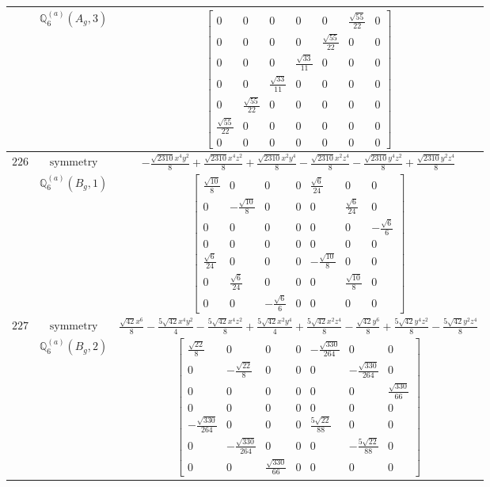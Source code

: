 \documentclass[fleqn,8pt,landscape]{jsarticle}
\begin{document}
\begin{longtable}{ccc}
$  $ & $ \mathbb{Q}_{6}^{(a)}(A_{g},3) $ & $ \begin{bmatrix} 0 & 0 & 0 & 0 & 0 & \frac{\sqrt{55}}{22} & 0 \\ 0 & 0 & 0 & 0 & \frac{\sqrt{55}}{22} & 0 & 0 \\ 0 & 0 & 0 & \frac{\sqrt{33}}{11} & 0 & 0 & 0 \\ 0 & 0 & \frac{\sqrt{33}}{11} & 0 & 0 & 0 & 0 \\ 0 & \frac{\sqrt{55}}{22} & 0 & 0 & 0 & 0 & 0 \\ \frac{\sqrt{55}}{22} & 0 & 0 & 0 & 0 & 0 & 0 \\ 0 & 0 & 0 & 0 & 0 & 0 & 0 \end{bmatrix} $ \\ \hline
$ 226 $ & $ \text{symmetry} $ & $ - \frac{\sqrt{2310} x^{4} y^{2}}{8} + \frac{\sqrt{2310} x^{4} z^{2}}{8} + \frac{\sqrt{2310} x^{2} y^{4}}{8} - \frac{\sqrt{2310} x^{2} z^{4}}{8} - \frac{\sqrt{2310} y^{4} z^{2}}{8} + \frac{\sqrt{2310} y^{2} z^{4}}{8} $ \\
$  $ & $ \mathbb{Q}_{6}^{(a)}(B_{g},1) $ & $ \begin{bmatrix} \frac{\sqrt{10}}{8} & 0 & 0 & 0 & \frac{\sqrt{6}}{24} & 0 & 0 \\ 0 & - \frac{\sqrt{10}}{8} & 0 & 0 & 0 & \frac{\sqrt{6}}{24} & 0 \\ 0 & 0 & 0 & 0 & 0 & 0 & - \frac{\sqrt{6}}{6} \\ 0 & 0 & 0 & 0 & 0 & 0 & 0 \\ \frac{\sqrt{6}}{24} & 0 & 0 & 0 & - \frac{\sqrt{10}}{8} & 0 & 0 \\ 0 & \frac{\sqrt{6}}{24} & 0 & 0 & 0 & \frac{\sqrt{10}}{8} & 0 \\ 0 & 0 & - \frac{\sqrt{6}}{6} & 0 & 0 & 0 & 0 \end{bmatrix} $ \\ \hline
$ 227 $ & $ \text{symmetry} $ & $ \frac{\sqrt{42} x^{6}}{8} - \frac{5 \sqrt{42} x^{4} y^{2}}{4} - \frac{5 \sqrt{42} x^{4} z^{2}}{8} + \frac{5 \sqrt{42} x^{2} y^{4}}{4} + \frac{5 \sqrt{42} x^{2} z^{4}}{8} - \frac{\sqrt{42} y^{6}}{8} + \frac{5 \sqrt{42} y^{4} z^{2}}{8} - \frac{5 \sqrt{42} y^{2} z^{4}}{8} $ \\
$  $ & $ \mathbb{Q}_{6}^{(a)}(B_{g},2) $ & $ \begin{bmatrix} \frac{\sqrt{22}}{8} & 0 & 0 & 0 & - \frac{\sqrt{330}}{264} & 0 & 0 \\ 0 & - \frac{\sqrt{22}}{8} & 0 & 0 & 0 & - \frac{\sqrt{330}}{264} & 0 \\ 0 & 0 & 0 & 0 & 0 & 0 & \frac{\sqrt{330}}{66} \\ 0 & 0 & 0 & 0 & 0 & 0 & 0 \\ - \frac{\sqrt{330}}{264} & 0 & 0 & 0 & \frac{5 \sqrt{22}}{88} & 0 & 0 \\ 0 & - \frac{\sqrt{330}}{264} & 0 & 0 & 0 & - \frac{5 \sqrt{22}}{88} & 0 \\ 0 & 0 & \frac{\sqrt{330}}{66} & 0 & 0 & 0 & 0 \end{bmatrix} $ \\ \hline

\end{longtable}
\end{document}
